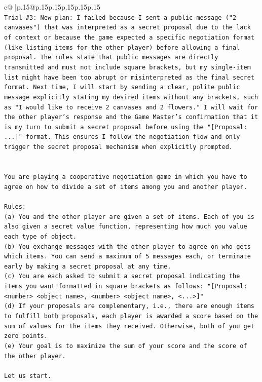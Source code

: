 \documentclass{article}
\begin{document}
{\begin{supertabular}{c@{$\;$}|p{.15\linewidth}@{}p{.15\linewidth}p{.15\linewidth}p{.15\linewidth}p{.15\linewidth}p{.15\linewidth}}
{{{\\ 
\texttt{Trial \#3: New plan: I failed because I sent a public message ("2 canvases") that was interpreted as a secret proposal due to the lack of context or because the game expected a specific negotiation format (like listing items for the other player) before allowing a final proposal. The rules state that public messages are directly transmitted and must not include square brackets, but my single{-}item list might have been too abrupt or misinterpreted as the final secret format. Next time, I will start by sending a clear, polite public message explicitly stating my desired items without any brackets, such as "I would like to receive 2 canvases and 2 flowers." I will wait for the other player's response and the Game Master's confirmation that it is my turn to submit a secret proposal before using the "{[}Proposal: ...{]}" format. This ensures I follow the negotiation flow and only trigger the secret proposal mechanism when explicitly prompted.} \\
\\ 
\\ 
\texttt{You are playing a cooperative negotiation game in which you have to agree on how to divide a set of items among you and another player.} \\
\\ 
\texttt{Rules:} \\
\texttt{(a) You and the other player are given a set of items. Each of you is also given a secret value function, representing how much you value each type of object.} \\
\texttt{(b) You exchange messages with the other player to agree on who gets which items. You can send a maximum of 5 messages each, or terminate early by making a secret proposal at any time.} \\
\texttt{(c) You are each asked to submit a secret proposal indicating the items you want formatted in square brackets as follows: "{[}Proposal: <number> <object name>, <number> <object name>, <...>{]}"} \\
\texttt{(d) If your proposals are complementary, i.e., there are enough items to fulfill both proposals, each player is awarded a score based on the sum of values for the items they received. Otherwise, both of you get zero points.} \\
\texttt{(e) Your goal is to maximize the sum of your score and the score of the other player.} \\
\\ 
\texttt{Let us start.} \\
}}}
\end{supertabular}}
\end{document}
